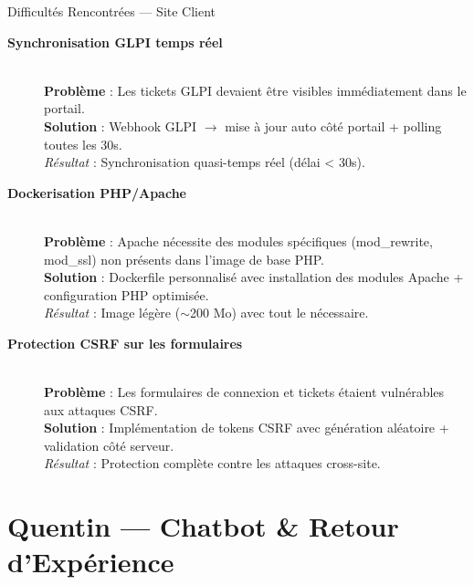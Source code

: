 \documentclass[xcolor=dvipsnames, aspectratio=169, 10pt]{beamer}
\begin{document}
\begin{frame}{Difficultés Rencontrées — Site Client}
  \begin{description}
    \item[\textbf{Synchronisation GLPI temps réel}] \hfill \\
      \textbf{Problème} : Les tickets GLPI devaient être visibles immédiatement dans le portail. \\
      \textbf{Solution} : Webhook GLPI $\rightarrow$ mise à jour auto côté portail + polling toutes les 30s. \\
      \textit{Résultat} : Synchronisation quasi-temps réel (délai < 30s).
    \item[\textbf{Dockerisation PHP/Apache}] \hfill \\
      \textbf{Problème} : Apache nécessite des modules spécifiques (mod\_rewrite, mod\_ssl) non présents dans l'image de base PHP. \\
      \textbf{Solution} : Dockerfile personnalisé avec installation des modules Apache + configuration PHP optimisée. \\
      \textit{Résultat} : Image légère ($\sim$200 Mo) avec tout le nécessaire.
    \item[\textbf{Protection CSRF sur les formulaires}] \hfill \\
      \textbf{Problème} : Les formulaires de connexion et tickets étaient vulnérables aux attaques CSRF. \\
      \textbf{Solution} : Implémentation de tokens CSRF avec génération aléatoire + validation côté serveur. \\
      \textit{Résultat} : Protection complète contre les attaques cross-site.
  \end{description}
\end{frame}

\section{Quentin — Chatbot \& Retour d'Expérience}
\end{document}
